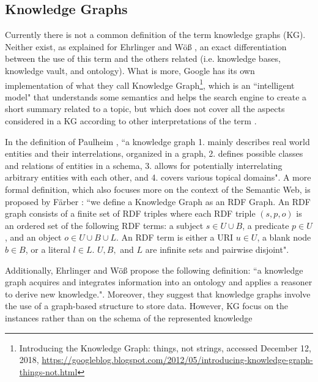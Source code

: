 \documentclass[runningheads]{llncs}
\begin{document}
\subsection{Knowledge Graphs} \label{knowledge-graphs}
Currently there is not a common definition of the term knowledge graphs (KG). Neither exist, as explained for Ehrlinger and W{\"o}{\ss} \cite{Ehrlinger}, an exact differentiation between the use of this term and the others related (i.e. knowledge bases, knowledge vault, and ontology). What is more, Google has its own implementation of what they call Knowledge Graph\footnote{Introducing the Knowledge Graph: things, not strings, accessed December 12, 2018,  \href{https://googleblog.blogspot.com/2012/05/introducing-knowledge-graph-things-not.html}{https://googleblog.blogspot.com/2012/05/introducing-knowledge-graph-things-not.html}}, which is an ``intelligent model" that understands some semantics and helps the search engine to create a short summary related to a topic, but which does not cover all the aspects considered in a KG according to other interpretations of the term \cite{Ehrlinger}.

In the definition of Paulheim \cite{Paulheim}, ``a knowledge graph
1. mainly describes real world entities and their interrelations, organized in a graph, 2. defines possible classes and relations of entities in a schema, 3. allows for potentially interrelating arbitrary entities with each other, and 4. covers various topical domains". A more formal definition, which also focuses more on the context of the Semantic Web, is proposed by F{\"a}rber \cite{Farber}: ``we define a Knowledge Graph as an RDF Graph. An RDF graph consists of a finite set of RDF triples where each RDF triple $(s, p, o)$ is an ordered set of the following RDF terms: a subject $s \in U ∪ B$, a predicate $p \in U$, and an object $o \in U ∪ B ∪ L$. An RDF term is either a URI $u \in U$, a blank node $b \in B$, or a literal $l \in L$. $U, B,$ and $L$ are infinite sets and pairwise disjoint".

Additionally, Ehrlinger and W{\"o}{\ss} \cite{Ehrlinger} propose the following definition: ``a knowledge graph acquires and integrates information into an ontology and applies a reasoner to derive new knowledge.". Moreover, they suggest that knowledge graphs involve the use of a graph-based structure to store data. However, KG focus on the instances rather than on the schema of the represented knowledge \cite{Paulheim}
\end{document}
